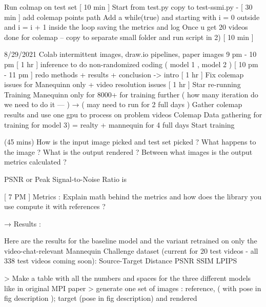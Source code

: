Run colmap on test set  [ 10 min ] 
Start from test.py copy to test-ssmi.py - [ 30 min ]
add colemap points path
Add a while(true) and starting with i = 0 outside and i = i + 1 inside the loop 
saving the metrics and log 
Once u get 20 videos done for colemap -- copy to separate small folder and run script in 2) [ 10 min ] 

8/29/2021
Colab intermittent images, draw.io pipelines, paper images
9 pm - 10 pm [ 1 hr ] inference to do non-randomized coding ( model 1 , model 2 ) 
 [ 10 pm - 11 pm ] redo methods + results + conclusion -> intro 
[ 1 hr ] Fix colemap issues for Manequinn only + video resolution issues 
[ 1 hr ] Star re-running Training Manequinn only for 8000+ for training further ( how many iteration do we need to do it --- ) → ( may need to run for 2 full days ) 
Gather colemap results and use one gpu to process on problem videos
Colemap Data gathering for training for model 3) = { realty + mannequin } for 4 full days 
Start training 

(45 mins) 
How is the input image picked and test set picked ?
What happens to the image ? 
What is the output rendered ? 
Between what images is the output metrics calculated ? 

PSNR or Peak Signal-to-Noise Ratio is 

[ 7 PM ]
Metrics : Explain math behind the metrics and how does the library you use compute it with references ? 

→ Results : 

Here are the results for the baseline model and the variant retrained on only the video-chat-relevant Mannequin Challenge dataset (current for 20 test videos - all 338 test videos coming soon):
Source-Target Distance PSNR SSIM LPIPS



























 
> Make a table with all the numbers and spaces for the three different models like in original MPI paper 
> generate one set of images : reference, ( with pose in fig description ); target (pose in fig description) and rendered 

